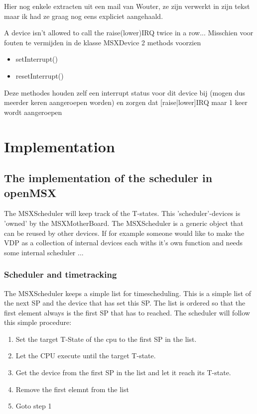 \documentclass[11pt, a4paper]{report}
\begin{document}
Hier nog enkele extracten uit een mail van Wouter, ze zijn verwerkt in zijn tekst maar
ik had ze graag nog eens expliciet aangehaald.

A device isn't allowed to call the raise(lower)IRQ twice in a row...
Misschien voor fouten te vermijden in de klasse MSXDevice 2 methods voorzien
\begin{itemize}
\item setInterrupt()
\item resetInterrupt()
\end{itemize}
Deze methodes houden zelf een interrupt status voor dit device bij (mogen dus 
meerder keren aangeroepen worden) en zorgen dat [raise|lower]IRQ maar 1 keer 
wordt aangeroepen



\chapter{Implementation}

\section{The implementation of the scheduler in openMSX}

The MSXScheduler will keep track of the T-states. This 'scheduler'-devices
is 'owned' by the MSXMotherBoard. The MSXScheduler is a generic object
that can be reused by other devices. If for example someone would like to
make the VDP as a collection of internal devices each withs it's own
function and needs some internal scheduler ...

\subsection{Scheduler and timetracking}

The MSXScheduler keeps a simple list for timescheduling. This is a simple
list of the next SP and the device that has set this SP. The list is
ordered so that the first element always is the first SP that has to
reached.  The scheduler will follow this simple procedure:
\begin{enumerate}
\item Set the target T-State of the cpu to the first SP in the list.
\item Let the CPU execute until the target T-state.
\item Get the device from the first SP in the list and let it reach its
T-state.
\item Remove the first elemnt from the list
\item Goto step 1
\end{enumerate}
\end{document}

